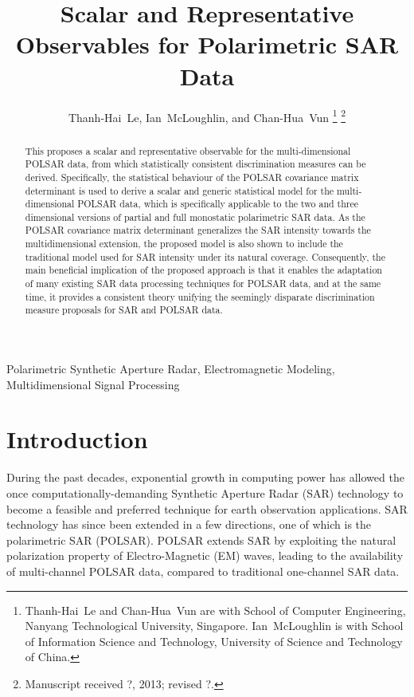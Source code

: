 \documentclass[journal]{IEEEtran}
\title{
  Scalar and Representative Observables for Polarimetric SAR Data
}
\author{Thanh-Hai~Le,
        Ian~McLoughlin, 
	and Chan-Hua~Vun%
\thanks{Thanh-Hai~Le and Chan-Hua~Vun are with School of Computer Engineering, 
Nanyang Technological University, Singapore. Ian~McLoughlin is with School of Information Science and Technology,
University of Science and Technology of China.
}%
\thanks{Manuscript received ?, 2013; revised ?.}}
\begin{document}
\maketitle

\begin{abstract}
This proposes a scalar and representative observable for the multi-dimensional POLSAR data,
  from which statistically consistent discrimination measures can be derived.
Specifically, the statistical behaviour of the POLSAR covariance matrix determinant is used
  to derive a scalar and generic statistical model for the multi-dimensional POLSAR data,
  which is specifically applicable to the two and three dimensional versions of partial and full monostatic polarimetric SAR data.
As the POLSAR covariance matrix determinant generalizes the SAR intensity towards the multidimensional extension,
  the proposed model is also shown to include the traditional model used for SAR intensity under its natural coverage.
Consequently, the main beneficial implication of the proposed approach is that
  it enables the adaptation of many existing SAR data processing techniques for POLSAR data,
  and at the same time, it provides a consistent theory unifying the seemingly disparate discrimination measure proposals for SAR and POLSAR data.
\end{abstract}

\begin{IEEEkeywords}
Polarimetric Synthetic Aperture Radar, Electromagnetic Modeling, Multidimensional Signal Processing  
\end{IEEEkeywords}

\IEEEpeerreviewmaketitle

\section{Introduction}

During the past decades, exponential growth in computing power has allowed the once computationally-demanding Synthetic Aperture Radar (SAR)
technology to become a feasible and preferred technique for earth observation applications.
SAR technology has since been extended in a few directions, one of which is the polarimetric SAR (POLSAR).
POLSAR extends SAR by exploiting the natural polarization property of Electro-Magnetic (EM) waves,
  leading to the availability of multi-channel POLSAR data, compared to traditional one-channel SAR data.
  
\end{document}
